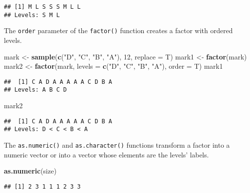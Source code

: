 \documentclass[]{book}
\newenvironment{Shaded}{\begin{snugshade}}{\end{snugshade}}
\newcommand{\KeywordTok}[1]{\textcolor[rgb]{0.13,0.29,0.53}{\textbf{{#1}}}}
\newcommand{\DataTypeTok}[1]{\textcolor[rgb]{0.13,0.29,0.53}{{#1}}}
\newcommand{\DecValTok}[1]{\textcolor[rgb]{0.00,0.00,0.81}{{#1}}}
\newcommand{\StringTok}[1]{\textcolor[rgb]{0.31,0.60,0.02}{{#1}}}
\newcommand{\NormalTok}[1]{{#1}}
\begin{document}
\begin{verbatim}
## [1] M L S S S M L L
## Levels: S M L
\end{verbatim}

The \texttt{order} parameter of the \texttt{factor()} function creates a
factor with ordered levels.

\begin{Shaded}
\begin{Highlighting}[]
\NormalTok{mark <-}\StringTok{ }\KeywordTok{sample}\NormalTok{(}\KeywordTok{c}\NormalTok{(}\StringTok{"D"}\NormalTok{, }\StringTok{"C"}\NormalTok{, }\StringTok{"B"}\NormalTok{, }\StringTok{"A"}\NormalTok{), }\DecValTok{12}\NormalTok{, }\DataTypeTok{replace =} \NormalTok{T)}
\NormalTok{mark1 <-}\StringTok{ }\KeywordTok{factor}\NormalTok{(mark)}
\NormalTok{mark2 <-}\StringTok{ }\KeywordTok{factor}\NormalTok{(mark, }\DataTypeTok{levels =} \KeywordTok{c}\NormalTok{(}\StringTok{"D"}\NormalTok{, }\StringTok{"C"}\NormalTok{, }\StringTok{"B"}\NormalTok{, }\StringTok{"A"}\NormalTok{), }\DataTypeTok{order =} \NormalTok{T)}
\NormalTok{mark1}
\end{Highlighting}
\end{Shaded}

\begin{verbatim}
##  [1] C A D A A A A A C D B A
## Levels: A B C D
\end{verbatim}

\begin{Shaded}
\begin{Highlighting}[]
\NormalTok{mark2}
\end{Highlighting}
\end{Shaded}

\begin{verbatim}
##  [1] C A D A A A A A C D B A
## Levels: D < C < B < A
\end{verbatim}

The \texttt{as.numeric()} and \texttt{as.character()} functions
transform a factor into a numeric vector or into a vector whose elements
are the levels' labels.

\begin{Shaded}
\begin{Highlighting}[]
\KeywordTok{as.numeric}\NormalTok{(size)}
\end{Highlighting}
\end{Shaded}

\begin{verbatim}
## [1] 2 3 1 1 1 2 3 3
\end{verbatim}
\end{document}
